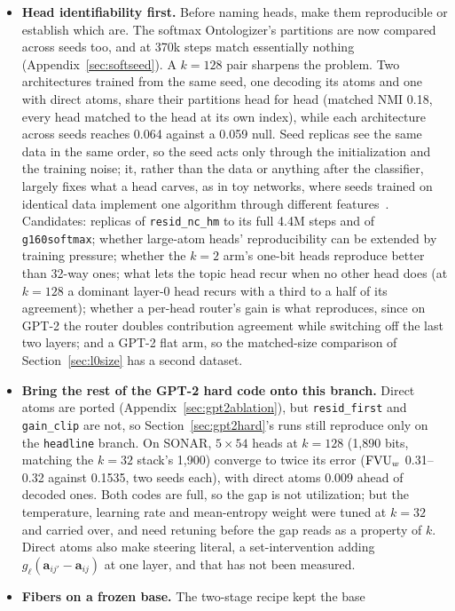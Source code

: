 \begin{itemize}
\item \textbf{Head identifiability first.} Before naming heads, make them
reproducible or establish which are. The softmax Ontologizer's
partitions are now compared across seeds too, and at 370k steps match
essentially nothing (Appendix~\ref{sec:softseed}). A $k{=}128$ pair
sharpens the problem. Two architectures trained from the same seed, one
decoding its atoms and one with direct atoms, share their partitions
head for head (matched NMI 0.18, every head matched to the head at its
own index), while each architecture across seeds reaches 0.064 against
a 0.059 null. Seed replicas see the same data in the same order, so the
seed acts only through the initialization and the training noise; it,
rather than the data or anything after the classifier, largely fixes
what a head carves, as in toy networks, where seeds trained on identical
data implement one algorithm through different
features~\cite{chughtai2023}. Candidates: replicas of \texttt{resid\_nc\_hm} to its
full 4.4M steps and of \texttt{g160softmax}; whether large-atom heads'
reproducibility can be extended by training pressure; whether the
$k{=}2$ arm's one-bit heads reproduce better than 32-way ones; what lets
the topic head recur when no other head does (at $k{=}128$ a dominant
layer-0 head recurs with a third to a half of its agreement); whether a
per-head router's gain is what reproduces, since on GPT-2 the router
doubles contribution agreement while switching off the last two layers;
and a GPT-2 flat arm, so the matched-size comparison of
Section~\ref{sec:l0size} has a second dataset.
\item \textbf{Bring the rest of the GPT-2 hard code onto this branch.}
Direct atoms are ported (Appendix~\ref{sec:gpt2ablation}), but
\texttt{resid\_first} and \texttt{gain\_clip} are not, so
Section~\ref{sec:gpt2hard}'s runs still reproduce only on the
\texttt{headline} branch. On SONAR, $5\times54$ heads at $k{=}128$
(1{,}890 bits, matching the $k{=}32$ stack's 1{,}900) converge to twice
its error ($\mathrm{FVU}_w$ 0.31--0.32 against 0.1535, two seeds each), with direct
atoms 0.009 ahead of decoded ones. Both codes are full, so the gap is not
utilization; but the temperature, learning rate and mean-entropy weight
were tuned at $k{=}32$ and carried over, and need retuning before the gap
reads as a property of $k$. Direct atoms also make steering literal, a
set-intervention adding $g_\ell(\mathbf{a}_{ij'} - \mathbf{a}_{ij})$ at
one layer, and that has not been measured.
\item \textbf{Fibers on a frozen base.} The two-stage recipe kept the base

\end{itemize}

